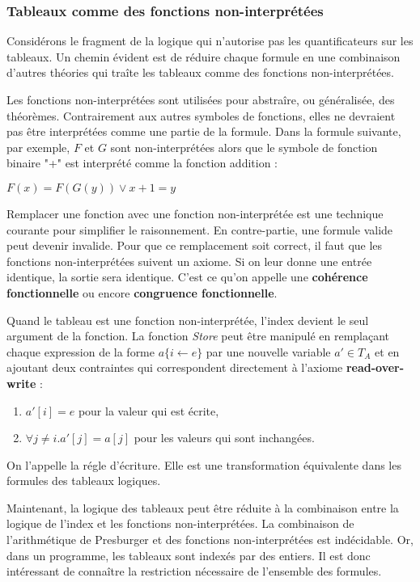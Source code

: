 \documentclass[9pt,openany]{book}
\begin{document}
	\subsubsection{Tableaux comme des fonctions non-interpr\'et\'ees}
	Consid\'erons le fragment de la logique qui n'autorise pas les quantificateurs sur les tableaux. Un chemin \'evident est de r\'eduire chaque formule en une combinaison d'autres th\'eories qui tra\^ite les tableaux comme des fonctions non-interpr\'et\'ees.\par
	Les fonctions non-interpr\'et\'ees sont utilis\'ees pour abstra\^ire, ou g\'en\'eralis\'ee, des th\'eor\`emes. Contrairement aux autres symboles de fonctions, elles ne devraient pas \^etre interpr\'et\'ees comme une partie de la formule. Dans la formule suivante, par exemple, $F$ et $G$ sont non-interpr\'et\'ees alors que le symbole de fonction binaire "+" est interpr\'et\'e comme la fonction addition :\par
$F(x) = F(G(y)) \lor x+1=y$\par
Remplacer une fonction avec une fonction non-interpr\'et\'ee est une technique courante pour simplifier le raisonnement.	En contre-partie, une formule valide peut devenir invalide. Pour que ce remplacement soit correct, il faut que les fonctions non-interpr\'et\'ees suivent un axiome. Si on leur donne une entr\'ee identique, la sortie sera identique. C'est ce qu'on appelle une \textbf{coh\'erence fonctionnelle} ou encore \textbf{congruence fonctionnelle}.\par
Quand le tableau est une fonction non-interpr\'et\'ee, l'index devient le seul argument de la fonction. La fonction \textit{Store} peut \^etre manipul\'e en rempla\c{c}ant chaque expression de la forme $a\{i\leftarrow e\}$ par une nouvelle variable $a'\in T_{A}$ et en ajoutant deux contraintes qui correspondent directement \`a l'axiome \textbf{read-over-write} :\par
\begin{enumerate}
\item $a'[i]=e$ pour la valeur qui est \'ecrite,
\item $\forall j\neq i. a'[j]=a[j]$ pour les valeurs qui sont inchang\'ees.
\end{enumerate}	
	
On l'appelle la r\'egle d'\'ecriture. Elle est une transformation \'equivalente dans les formules des tableaux logiques.\par
Maintenant, la logique des tableaux peut \^etre r\'eduite \`a la combinaison entre la logique de l'index et les fonctions non-interpr\'et\'ees. La combinaison de l'arithm\'etique de Presburger et des fonctions non-interpr\'et\'ees est ind\'ecidable. Or, dans un programme, les tableaux sont index\'es par des entiers. Il est donc int\'eressant de conna\^itre la restriction n\'ecessaire de l'ensemble des formules.\par
	
\end{document}
